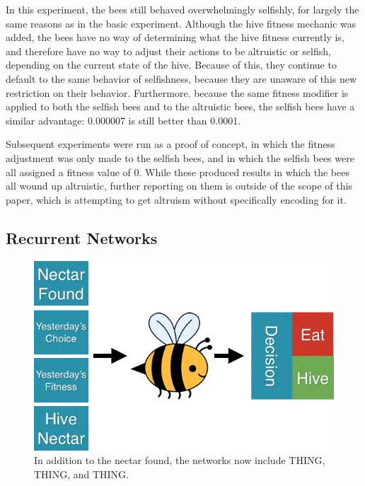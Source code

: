 \documentclass[11pt]{article}
\begin{document}
			In this experiment, the bees still behaved overwhelmingly selfishly, for largely the same reasons as in the basic experiment. Although the hive fitness mechanic was added, the bees have no way of determining what the hive fitness currently is, and therefore have no way to adjust their actions to be altruistic or selfish, depending on the current state of the hive. Because of this, they continue to default to the same behavior of selfishness, because they are unaware of this new restriction on their behavior. Furthermore. because the same fitness modifier is applied to both the selfish bees and to the altruistic bees, the selfish bees have a similar advantage: 0.000007 is still better than 0.0001.

			Subsequent experiments were run as a proof of concept, in which the fitness adjustment was only made to the selfish bees, and in which the selfish bees were all assigned a fitness value of 0. While these produced results in which the bees all wound up altruistic, further reporting on them is outside of the scope of this paper, which is attempting to get altruism without specifically encoding for it.


		\subsection{Recurrent Networks} %
		\label{sub:recurrent_networks}

			\begin{figure}[tb]
				\begin{center}
					\includegraphics[scale=.5]{bee_diagrams/recurrent_system.png}
				\end{center}
				\caption{In addition to the nectar found, the networks now include THING, THING, and THING.}
				\label{fig:recurrent_system}
			\end{figure}
\end{document}
